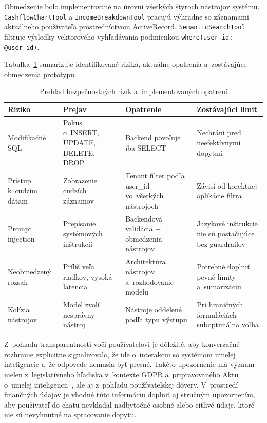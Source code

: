 Obmedzenie bolo implementované na úrovni všetkých štyroch nástrojov systému.
\texttt{CashflowChartTool} a \texttt{IncomeBreakdownTool} pracujú výhradne so
záznamami aktuálneho používateľa prostredníctvom ActiveRecord. \texttt{SemanticSearchTool}
filtruje výsledky vektorového vyhľadávania podmienkou \texttt{where(user\_id: @user\_id)}.

Tabuľka~\ref{tab:bezpecnostne_rizika} sumarizuje identifikované riziká, aktuálne
opatrenia a~zostávajúce obmedzenia prototypu.

\begin{table}[H]
	\centering
	\caption{Prehľad bezpečnostných rizík a~implementovaných opatrení}
	\label{tab:bezpecnostne_rizika}
	\begin{tabular}{@{}p{2.5cm}p{3cm}p{3.5cm}p{3.5cm}@{}}
		\toprule \textbf{Riziko}             & \textbf{Prejav}                      & \textbf{Opatrenie}                                  & \textbf{Zostávajúci limit}                             \\
		\midrule Modifikačné SQL             & Pokus o~INSERT, UPDATE, DELETE, DROP & Backend povoľuje iba SELECT                         & Nechráni pred neefektívnymi dopytmi                    \\
		\addlinespace Prístup k~cudzím dátam & Zobrazenie cudzích záznamov          & Tenant filter podľa user\_id vo~všetkých nástrojoch & Závisí od korektnej aplikácie filtra                   \\
		\addlinespace Prompt injection       & Prepísanie systémových inštrukcií    & Backendová validácia + obmedzenia nástrojov         & Jazykové inštrukcie nie sú postačujúce bez guardrailov \\
		\addlinespace Neobmedzený rozsah     & Príliš veľa riadkov, vysoká latencia & Architektúra nástrojov a~rozhodovanie modelu        & Potrebné doplniť pevné limity a~sumarizáciu            \\
		\addlinespace Kolízia nástrojov      & Model zvolí nesprávny nástroj        & Nástroje oddelené podľa typu výstupu                & Pri hraničných formuláciách suboptimálna voľba         \\
		\bottomrule
	\end{tabular}
\end{table}

Z~pohľadu transparentnosti voči používateľovi je dôležité, aby konverzačné
rozhranie explicitne signalizovalo, že ide o~interakciu so systémom umelej inteligencie
a~že odpovede nemusia byť presné. Takéto upozornenie má význam nielen z~legislatívneho
hľadiska v~kontexte GDPR a~pripravovaného Aktu o~umelej inteligencii~\cite{euaiact2024},
ale aj z~pohľadu používateľskej dôvery. V~prostredí finančných údajov je vhodné
túto informáciu doplniť aj stručným upozornením, aby používateľ do chatu nevkladal
nadbytočné osobné alebo citlivé údaje, ktoré nie sú nevyhnutné na spracovanie
dopytu.

